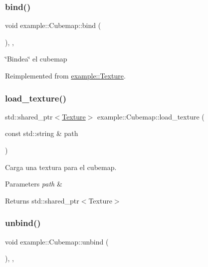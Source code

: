 \subsubsection{\texorpdfstring{bind()}{bind()}}
{\footnotesize\ttfamily void example\+::\+Cubemap\+::bind (\begin{DoxyParamCaption}{ }\end{DoxyParamCaption})\hspace{0.3cm}{\ttfamily [inline]}, {\ttfamily [override]}, {\ttfamily [virtual]}}



\char`\"{}\+Bindea\char`\"{} el cubemap 



Reimplemented from \mbox{\hyperlink{classexample_1_1_texture}{example\+::\+Texture}}.

\mbox{\label{classexample_1_1_cubemap_a18940faf62bea6cdef2fb306fd037b3c}} 
\subsubsection{\texorpdfstring{load\_texture()}{load\_texture()}}
{\footnotesize\ttfamily std\+::shared\+\_\+ptr$<$\mbox{\hyperlink{classexample_1_1_texture}{Texture}}$>$ example\+::\+Cubemap\+::load\+\_\+texture (\begin{DoxyParamCaption}\item[{const std\+::string \&}]{path }\end{DoxyParamCaption})}



Carga una textura para el cubemap. 


\begin{DoxyParams}{Parameters}
{\em path} & \\
\hline
\end{DoxyParams}
\begin{DoxyReturn}{Returns}
std\+::shared\+\_\+ptr$<$\+Texture$>$ 
\end{DoxyReturn}
\mbox{\label{classexample_1_1_cubemap_a95571938ee65dcb9dce352e175b63247}} 
\subsubsection{\texorpdfstring{unbind()}{unbind()}}
{\footnotesize\ttfamily void example\+::\+Cubemap\+::unbind (\begin{DoxyParamCaption}{ }\end{DoxyParamCaption})\hspace{0.3cm}{\ttfamily [inline]}, {\ttfamily [override]}, {\ttfamily [virtual]}}



